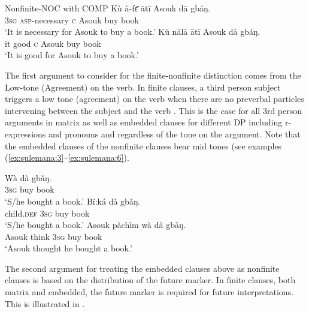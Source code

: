 \documentclass[output=paper,colorlinks,citecolor=brown]{langscibook}
\begin{document}
\ea%
    \label{ex:sulemana:6}
    Nonfinite-NOC with COMP
    \ea%
    \label{ex:sulemana:6a}
    \gll    Kù à-fɛ̄ ātī Asouk dā gbáŋ.\\
            \textsc{3sg} \textsc{asp}-necessary \textsc{c} Asouk buy book\\
    \glt    `It is necessary for Asouk to buy a book.' 
    \ex%
    \label{ex:sulemana:6b}
    \gll    Kù nālā ātī Asouk dā gbáŋ.\\
            it good \textsc{c} Asouk buy book\\
    \glt    `It is good for Asouk to buy a book.' 
    \z
\z

The first argument to consider for the finite-nonfinite distinction comes from the Low-tone (Agreement) on the verb. In finite clauses, a third person subject triggers a low tone (agreement) on the verb when there are no preverbal particles intervening between the subject and the verb . This is the case for all 3rd person arguments in matrix as well as embedded clauses for different DP including r-expressions and pronouns and regardless of the tone on the argument. Note that the embedded clauses of the nonfinite clauses bear mid tones (see examples (\ref{ex:sulemana:3}--\ref{ex:sulemana:6}). 

\ea%
    \label{ex:sulemana:7}
    \ea%
    \label{ex:sulemana:7a}
    \gll    Wà dà gbǎŋ.  \\
            \textsc{3sg}  buy book\\
    \glt    `S/he bought a book.'
    \ex%
    \label{ex:sulemana:7b}
    \gll    Bí:ká dà gbǎŋ.  \\
            child.\textsc{def} \textsc{3sg}  buy book\\
    \glt    `S/he bought a book.' 
    \ex%
    \label{ex:sulemana:7c}
    \gll    Asouk pàchìm wà dà gbǎŋ.  \\
            Asouk think \textsc{3sg} buy book\\
    \glt    `Asouk thought he bought a book.' 
    \z
\z

The second argument for treating the embedded clauses above as nonfinite clauses is based on the distribution of the future marker. In finite clauses, both matrix and embedded, the future marker is required for future interpretations. This is illustrated in .
\end{document}
